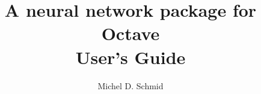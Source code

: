 
\title{A neural network package for Octave\\
		User's Guide \\
				}

\author{Michel D. Schmid}
\maketitle
